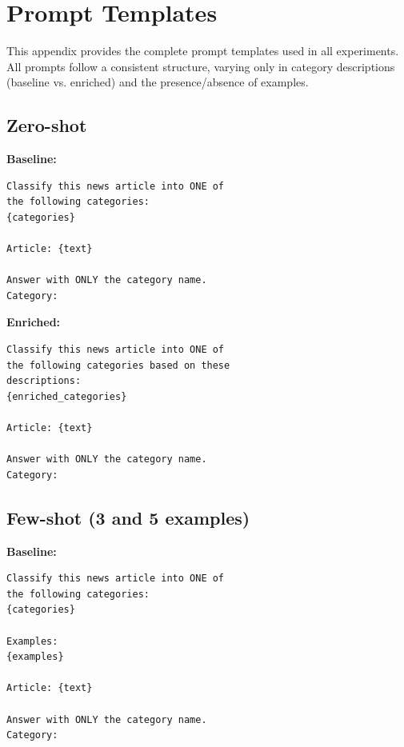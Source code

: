 \documentclass[sigconf,nonacm]{acmart}
\begin{document}
\newpage
\appendix

\section{Prompt Templates}
\label{app:prompts}

This appendix provides the complete prompt templates used in all experiments. All prompts follow a consistent structure, varying only in category descriptions (baseline vs. enriched) and the presence/absence of examples.

\subsection{Zero-shot}

\textbf{Baseline:}
\begin{small}
\begin{verbatim}
Classify this news article into ONE of 
the following categories:
{categories}

Article: {text}

Answer with ONLY the category name.
Category:
\end{verbatim}
\end{small}

\textbf{Enriched:}
\begin{small}
\begin{verbatim}
Classify this news article into ONE of 
the following categories based on these 
descriptions:
{enriched_categories}

Article: {text}

Answer with ONLY the category name.
Category:
\end{verbatim}
\end{small}

\subsection{Few-shot (3 and 5 examples)}

\textbf{Baseline:}
\begin{small}
\begin{verbatim}
Classify this news article into ONE of 
the following categories:
{categories}

Examples:
{examples}

Article: {text}

Answer with ONLY the category name.
Category:
\end{verbatim}
\end{small}
\end{document}
